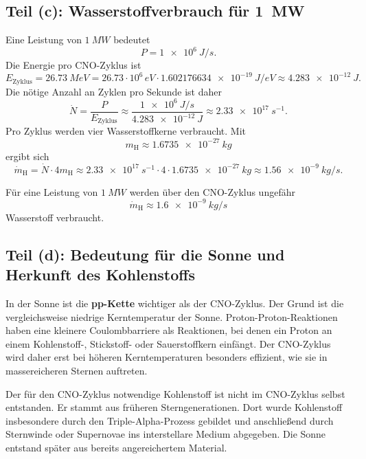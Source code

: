 \documentclass[11pt,a4paper]{scrartcl}
\theoremstyle{definition}
\theoremstyle{plain}
\theoremstyle{remark}
\begin{document}
\subsection{Teil (c): Wasserstoffverbrauch für \texorpdfstring{\SI{1}{MW}}{1 MW}}

\begin{calculationbox}
Eine Leistung von \(\SI{1}{MW}\) bedeutet
\[
    P=\SI{1e6}{J/s}.
\]
Die Energie pro CNO-Zyklus ist
\[
    E_{\mathrm{Zyklus}}
    = \SI{26.73}{MeV}
    = 26.73\cdot 10^6\,\si{eV}\cdot \SI{1.602176634e-19}{J/eV}
    \approx \SI{4.283e-12}{J}.
\]
Die nötige Anzahl an Zyklen pro Sekunde ist daher
\[
    \dot{N}
    = \frac{P}{E_{\mathrm{Zyklus}}}
    \approx \frac{\SI{1e6}{J/s}}{\SI{4.283e-12}{J}}
    \approx \SI{2.33e17}{s^{-1}}.
\]
Pro Zyklus werden vier Wasserstoffkerne verbraucht. Mit
\[
    m_{\mathrm{H}}\approx \SI{1.6735e-27}{kg}
\]
ergibt sich
\[
    \dot{m}_{\mathrm{H}}
    = \dot{N}\cdot 4m_{\mathrm{H}}
    \approx \SI{2.33e17}{s^{-1}}\cdot 4\cdot \SI{1.6735e-27}{kg}
    \approx \SI{1.56e-9}{kg/s}.
\]
\end{calculationbox}

\begin{answerbox}
Für eine Leistung von \(\SI{1}{MW}\) werden über den CNO-Zyklus ungefähr
\[
    \boxed{\dot{m}_{\mathrm{H}}\approx \SI{1.6e-9}{kg/s}}
\]
Wasserstoff verbraucht.
\end{answerbox}

\subsection{Teil (d): Bedeutung für die Sonne und Herkunft des Kohlenstoffs}

\begin{solutionbox}
In der Sonne ist die \textbf{pp-Kette} wichtiger als der CNO-Zyklus. Der Grund ist die vergleichsweise niedrige Kerntemperatur der Sonne. Proton-Proton-Reaktionen haben eine kleinere Coulombbarriere als Reaktionen, bei denen ein Proton an einem Kohlenstoff-, Stickstoff- oder Sauerstoffkern einfängt. Der CNO-Zyklus wird daher erst bei höheren Kerntemperaturen besonders effizient, wie sie in massereicheren Sternen auftreten.

Der für den CNO-Zyklus notwendige Kohlenstoff ist nicht im CNO-Zyklus selbst entstanden. Er stammt aus früheren Sterngenerationen. Dort wurde Kohlenstoff insbesondere durch den Triple-Alpha-Prozess gebildet und anschließend durch Sternwinde oder Supernovae ins interstellare Medium abgegeben. Die Sonne entstand später aus bereits angereichertem Material.
\end{solutionbox}
\end{document}
